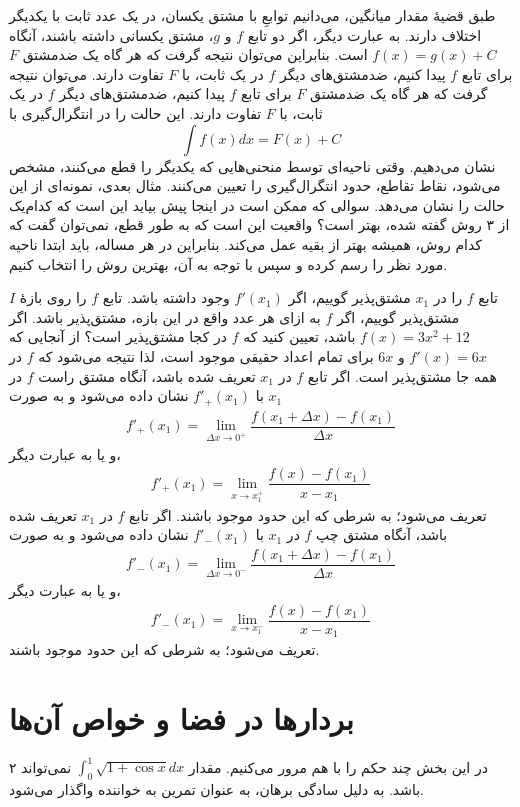 \begin{ptheorem1}
طبق قضیهٔ مقدار میانگین، می‌دانیم توابعِ با مشتق یکسان، در یک عدد ثابت
 با یکدیگر اختلاف دارند. به عبارت دیگر، اگر  دو تابع $f$ و $g$، مشتق یکسانی داشته باشند، آنگاه $f(x)=g(x)+C$ است. بنابراین می‌توان نتیجه 
 گرفت که هر گاه یک ضدمشتق $F$ برای تابع $f$ پیدا کنیم، ضدمشتق‌های دیگر $f$ در یک ثابت، با $F$ تفاوت دارند.
 می‌توان نتیجه 
 گرفت که هر گاه یک ضدمشتق $F$ برای تابع $f$ پیدا کنیم، ضدمشتق‌های دیگر $f$ در یک ثابت، با $F$ تفاوت دارند. این حالت را در انتگرال‌گیری با 
\[
 \int f(x)dx= F(x)+C
\]
 نشان می‌دهیم. وقتی ناحیه‌ای توسط منحنی‌هایی که یکدیگر را قطع می‌کنند، مشخص می‌شود، 
نقاط تقاطع، حدود انتگرال‌گیری را تعیین می‌کنند. مثال بعدی، نمونه‌ای از این 
حالت را نشان می‌دهد. سوالی که ممکن است در اینجا پیش بیاید این است که کدام‌یک از ۳ روش گفته شده، بهتر است؟ واقعیت این است که به طور قطع، نمی‌توان گفت که کدام روش، همیشه بهتر از بقیه عمل می‌کند.
 بنابراین در هر مساله، باید ابتدا
ناحیه مورد نظر را رسم کرده و سپس با توجه به آن، بهترین روش را انتخاب کنیم.
\end{ptheorem1}
تابع $f$ را در $x_1$ مشتق‌پذیر گوییم، اگر $f'(x_1)$ وجود داشته باشد.
تابع $f$ را روی بازهٔ $I$ مشتق‌پذیر گوییم، اگر $f$ به ازای هر عدد واقع در این بازه، مشتق‌پذیر باشد.
اگر $f(x)=3x^2+12$ باشد، تعیین کنید که $f$ در کجا مشتق‌پذیر است؟
از آنجایی که $f'(x)=6x$  و $6x$ برای تمام اعداد حقیقی موجود است، لذا نتیجه
می‌شود که $f$ در همه جا مشتق‌پذیر است.
اگر تابع $f$ در $x_1$ تعریف شده باشد، آنگاه مشتق راست $f$ در $x_1$ با $f'_{+}(x_1)$ نشان داده
می‌شود و به صورت 
\begin{align}
f'_{+}(x_1)=\lim_{\Delta x\rightarrow 0^{+}}\dfrac{f(x_1+\Delta x) - f(x_1)}{\Delta x}
\end{align}
و یا به عبارت دیگر،
\begin{align}
f'_{+}(x_1)=\lim_{ x\rightarrow x_1^{+}}\dfrac{f(x) - f(x_1)}{x-x_1}
\end{align}
تعریف می‌شود؛ به شرطی که این حدود موجود باشند.
اگر تابع $f$ در $x_1$ تعریف شده باشد، آنگاه مشتق چپ $f$ در $x_1$ با $f'_{-}(x_1)$ نشان داده
می‌شود و به صورت 
\begin{align}
f'_{-}(x_1)=\lim_{\Delta x\rightarrow 0^{-}}\dfrac{f(x_1+\Delta x) - f(x_1)}{\Delta x}
\end{align}
و یا به عبارت دیگر،
\begin{align}
f'_{-}(x_1)=\lim_{ x\rightarrow x_1^{-}}\dfrac{f(x) - f(x_1)}{x-x_1}
\end{align}
تعریف می‌شود؛ به شرطی که این حدود موجود باشند.
\section{بردارها در فضا و خواص آن‌ها}
در این بخش چند حکم را با هم مرور می‌کنیم. 
مقدار  $\int_0 ^1\sqrt{1+\cos x} dx $ نمی‌تواند ۲ باشد.
به دلیل سادگی برهان، به عنوان تمرین به خواننده واگذار می‌شود.


